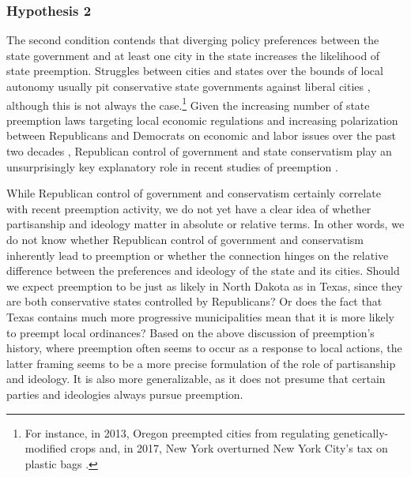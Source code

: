 \documentclass[12pt]{article}
\begin{document}
\subsubsection*{Hypothesis 2}
The second condition contends that diverging policy preferences between the state government and at least one city in the state increases the likelihood of state preemption. Struggles between cities and states over the bounds of local autonomy usually pit conservative state governments against liberal cities \parencite{rapoportBlueCitiesBattle2016,riverstone-newellRiseStatePreemption2017}, although this is not always the case.\footnote{For instance, in 2013, Oregon preempted cities from regulating genetically-modified crops and, in 2017, New York overturned New York City's tax on plastic bags \parencite{mckinleyCuomoBlocksNew2017,scharffHyperPreemptionReordering2018}.} Given the increasing number of state preemption laws targeting local economic regulations and increasing polarization between Republicans and Democrats on economic and labor issues over the past two decades \parencite{grumbachBackwatersMajorPolicymakers2018}, Republican control of government and state conservatism play an unsurprisingly key explanatory role in recent studies of preemption \parencite{hicksHomeRuleBe2018,riverstone-newellRiseStatePreemption2017,flavinExplainingStatePreemption2019,fowlerStatePreemptionLocal2019}. 

While Republican control of government and conservatism certainly correlate with recent preemption activity, we do not yet have a clear idea of whether partisanship and ideology matter in absolute or relative terms. In other words, we do not know whether Republican control of government and conservatism inherently lead to preemption or whether the connection hinges on the relative difference between the preferences and ideology of the state and its cities. Should we expect preemption to be just as likely in North Dakota as in Texas, since they are both conservative states controlled by Republicans? Or does the fact that Texas contains much more progressive municipalities mean that it is more likely to preempt local ordinances? Based on the above discussion of preemption's history, where preemption often seems to occur as a response to local actions, the latter framing seems to be a more precise formulation of the role of partisanship and ideology. It is also more generalizable, as it does not presume that certain parties and ideologies always pursue preemption. 
\end{document}
